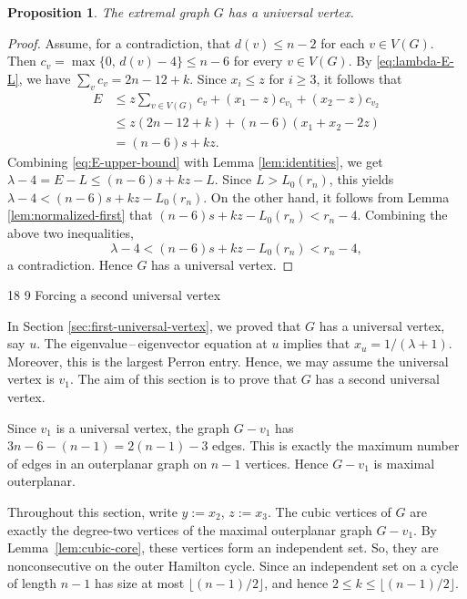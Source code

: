 \documentclass[11pt]{article}
\makeatletter
\renewcommand\section{\@startsection{section}{1}{\z@}%
{18\p@ \@plus 6\p@ \@minus 3\p@}%
{9\p@ \@plus 6\p@ \@minus 3\p@}%
{\large\bfseries\boldmath}}
\theoremstyle{plain}
\newtheorem{proposition}{Proposition}[section]
\theoremstyle{definition}
\numberwithin{equation}{section}
\makeatother
\begin{document}
\begin{proposition}\label{prop:universal}
The extremal graph $G$ has a universal vertex.
\end{proposition}

\begin{proof}
Assume, for a contradiction, that $d(v)\leq n-2$ for each $v\in V(G)$.
Then $c_v = \max\{0,\, d(v) - 4\} \leq n-6$ for every $v\in V(G)$.
By \eqref{eq:lambda-E-L}, we have $\sum_v c_v = 2n - 12 + k$. Since
$x_i\leq z$ for $i\geq 3$, it follows that
\begin{align}
E
& \leq z\sum_{v\in V(G)} c_v + (x_1 - z)c_{v_1} + (x_2 - z)c_{v_2} \nonumber \\
& \leq z(2n - 12 + k) + (n-6)(x_1 + x_2 - 2z) \nonumber \\
& = (n-6)s + kz. \label{eq:E-upper-bound}
\end{align}
Combining \eqref{eq:E-upper-bound} with Lemma \ref{lem:identities}, we get
$\lambda - 4 = E - L\leq (n - 6)s + kz - L$.
Since $L > L_0(r_n)$, this yields
$\lambda - 4 < (n - 6)s + kz - L_0(r_n)$.
On the other hand, it follows from Lemma \ref{lem:normalized-first} that
$(n-6)s + kz - L_0(r_n) < r_n - 4$.
Combining the above two inequalities,
\[
\lambda - 4 < (n - 6)s + kz - L_0(r_n) < r_n - 4,
\]
a contradiction. Hence $G$ has a universal vertex.
\end{proof}

\section{Forcing a second universal vertex}
\label{sec:second-universal-vertex}

In Section \ref{sec:first-universal-vertex}, we proved that $G$ has a universal vertex, say $u$. 
The eigenvalue\,--\,eigenvector equation at $u$ implies that $x_u = 1/(\lambda + 1)$. 
Moreover, this is the largest Perron entry. Hence, we may assume the universal vertex is $v_1$.
The aim of this section is to prove that $G$ has a second universal vertex.

Since $v_1$ is a universal vertex, the graph $G - v_1$ has
$3n - 6- (n - 1) = 2(n-1) - 3$ edges. This is exactly the maximum number of edges in an outerplanar
graph on $n-1$ vertices. Hence $G - v_1$ is maximal outerplanar.

Throughout this section, write $y := x_2$, $z := x_3$. The cubic vertices of $G$ are exactly 
the degree-two vertices of the maximal outerplanar graph $G - v_1$. By Lemma~\ref{lem:cubic-core}, these
vertices form an independent set. So, they are nonconsecutive on the outer Hamilton cycle. 
Since an independent set on a cycle of length $n-1$ has size at most
$\lfloor(n-1)/2\rfloor$, and hence $2\leq k\leq\lfloor (n-1)/2\rfloor$.
\end{document}
